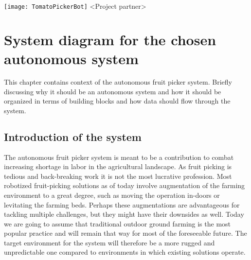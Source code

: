 \documentclass[%
oneside,    %
project,    %
nosummary   %
]{USN-MSc}
\newcommand{\myauthor}{%
223786 Lars Rikard Rådstoga
}
\newcommand{\myparticipants}{
<First participant>\\
<Second participant>\\
<Third participant>\\
<Fourth participant>
}
\begin{document}
\USNtitlepage%
{%
  {\normalsize}
   \texttt{[image: TomatoPickerBot]}}
{<Project partner>}
{%
\lipsum[6-7]
}





\tableofcontents
{}



\chapter{System diagram for the chosen autonomous system}
\label{ch:sysDiagram}
This chapter contains context of the autonomous fruit picker system. Briefly discussing why it should be an autonomous system and how it should be organized in terms of building blocks and how data should flow through the system.
\section{Introduction of the system}
The autonomous fruit picker system is meant to be a contribution to combat increasing shortage in labor in the agricultural landscape. As fruit picking is tedious and back-breaking work it is not the most lucrative profession. Most robotized fruit-picking solutions as of today involve augmentation of the farming environment to a great degree, such as moving the operation in-doors or levitating the farming beds. Perhaps these augmentations are advantageous for tackling multiple challenges, but they might have their downsides as well. Today we are going to assume that traditional outdoor ground farming is the most popular practice and will remain that way for most of the foreseeable future. The target environment for the system will therefore be a more rugged and unpredictable one compared to environments in which existing solutions operate.
\end{document}
